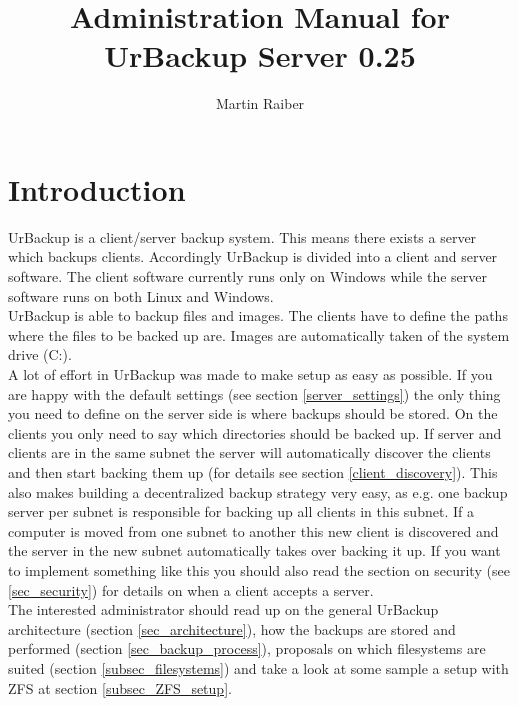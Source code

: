 \documentclass[a4paper,10pt]{article}
\begin{document}

\author{Martin Raiber}
\title{Administration Manual for\\UrBackup Server 0.25}

\maketitle

\tableofcontents

\section{Introduction}

UrBackup is a client/server backup system. This means there exists a server which backups clients. Accordingly UrBackup is divided into a client and server software. The client software currently runs only on Windows while the server software runs on both Linux and Windows.\\
UrBackup is able to backup files and images. The clients have to define the paths where the files to be backed up are. Images are automatically taken of the system drive (C:).\\
A lot of effort in UrBackup was made to make setup as easy as possible. If you are happy with the default settings (see section \ref{server_settings}) the only thing you need to define on the server side is where backups should be stored. On the clients you only need to say which directories should be backed up. If server and clients are in the same subnet the server will automatically discover the clients and then start backing them up (for details see section \ref{client_discovery}). This also makes building a decentralized backup strategy very easy, as e.g. one backup server per subnet is responsible for backing up all clients in this subnet. If a computer is moved from one subnet to another this new client is discovered and the server in the new subnet automatically takes over backing it up. If you want to implement something like this you should also read the section on security (see \ref{sec_security}) for details on when a client accepts a server.\\
The interested administrator should read up on the general UrBackup architecture (section \ref{sec_architecture}), how the backups are stored and performed (section \ref{sec_backup_process}), proposals on which filesystems are suited (section \ref{subsec_filesystems}) and take a look at some sample a setup with ZFS at section \ref{subsec_ZFS_setup}.
\end{document}
